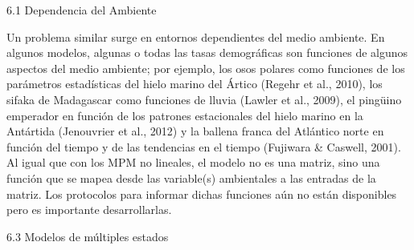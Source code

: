 \documentclass[
  12pt,
  letterpaper,
]{book}
\begin{document}
6.1 \textbar{} Dependencia del Ambiente

Un problema similar surge en entornos dependientes del medio ambiente.
En algunos modelos, algunas o todas las tasas demográficas son funciones
de algunos aspectos del medio ambiente; por ejemplo, los osos polares
como funciones de los parámetros estadísticas del hielo marino del
Ártico (Regehr et al., 2010), los sifaka de Madagascar como funciones de
lluvia (Lawler et al., 2009), el pingüino emperador en función de los
patrones estacionales del hielo marino en la Antártida (Jenouvrier et
al., 2012) y la ballena franca del Atlántico norte en función del tiempo
y de las tendencias en el tiempo (Fujiwara \& Caswell, 2001). Al igual
que con los MPM no lineales, el modelo no es una matriz, sino una
función que se mapea desde las variable(s) ambientales a las entradas de
la matriz. Los protocolos para informar dichas funciones aún no están
disponibles pero es importante desarrollarlas.

6.3 \textbar{} Modelos de múltiples estados
\end{document}
